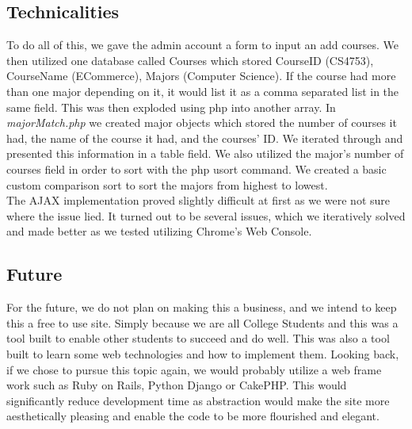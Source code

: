 \documentclass{article}
\begin{document}
\begin{doublespace}
\subsection*{Technicalities}
\indent To do all of this, we gave the admin account a form to input an add courses. We then utilized one database called Courses which stored CourseID (CS4753), CourseName (ECommerce), Majors (Computer Science). If the course had more than one major depending on it, it would list it as a comma separated list in the same field. This was then exploded using php into another array. In \emph{majorMatch.php} we created major objects which stored the number of courses it had, the name of the course it had, and the courses' ID. We iterated through and presented this information in a table field. We also utilized the major's number of courses field in order to sort with the php usort command. We created a basic custom comparison sort to sort the majors from highest to lowest.\\

The AJAX implementation proved slightly difficult at first as we were not sure where the issue lied. It turned out to be several issues, which we iteratively solved and made better as we tested utilizing Chrome's Web Console.

\subsection*{Future}
\indent For the future, we do not plan on making this a business, and we intend to keep this a free to use site. Simply because we are all College Students and this was a tool built to enable other students to succeed and do well. This was also a tool built to learn some web technologies and how to implement them. Looking back, if we chose to pursue this topic again, we would probably utilize a web frame work such as Ruby on Rails, Python Django or CakePHP. This would significantly reduce development time as abstraction would make the site more aesthetically pleasing and enable the code to be more flourished and elegant.
\end{doublespace}
\end{document}
